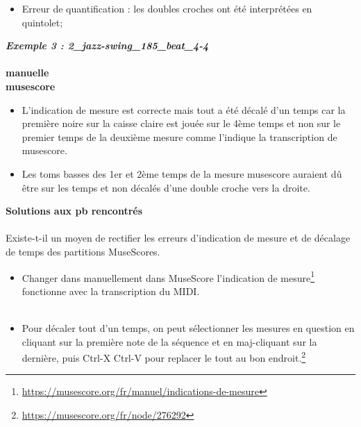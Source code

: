 \begin{itemize}
	\item Erreur de quantification : les doubles croches ont été interprétées en quintolet;\\
\end{itemize}
\textbf{\textit{Exemple 3 : 2\_jazz-swing\_185\_beat\_4-4}}
\\\\
\textbf{manuelle}\\
\textbf{musescore}\\
\begin{itemize}
	\item L’indication de mesure est correcte mais tout a été décalé d’un temps car la première noire sur la caisse claire est jouée sur le 4ème temps et non sur le premier temps de la deuxième mesure comme l’indique la transcription de musescore.
	\item Les toms basses des 1er et 2ème temps de la mesure musescore auraient dû être sur les temps et non décalés d’une double croche vers la droite.\\
\end{itemize}
\textbf{Solutions aux pb rencontrés}\\\\
Existe-t-il un moyen de rectifier les erreurs d’indication de mesure et de décalage de temps des partitions MuseScores.\\
\begin{itemize}
	\item Changer dans manuellement dans MuseScore l’indication de mesure\footnote{\url{https://musescore.org/fr/manuel/indications-de-mesure}} fonctionne avec la transcription du MIDI. \\\\ %
	\item Pour décaler tout d’un temps, on peut sélectionner les mesures en question en cliquant sur la première note de la séquence et en maj-cliquant sur la dernière, puis Ctrl-X Ctrl-V pour replacer le tout au bon endroit.\footnote{\url{https://musescore.org/fr/node/276292}}\\
\end{itemize}

